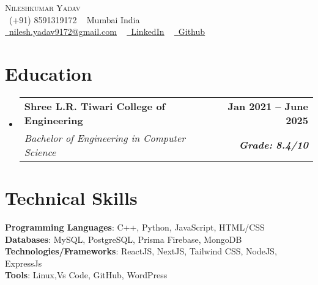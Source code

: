 \documentclass[letterpaper,11pt]{article}
\makeatletter
\newcommand{\resumeSubheading}[4]{
  \vspace{-2pt}\item
    \begin{tabular*}{1.0\textwidth}[t]{l@{\extracolsep{\fill}}r}
      \textbf{#1} & \textbf{\small #2} \\
      \textit{\small#3} & \textit{\small #4} \\
    \end{tabular*}\vspace{-7pt}
}
\newcommand{\resumeSubHeadingListStart}{\begin{itemize}[leftmargin=0.0in, label={}]}
\newcommand{\resumeSubHeadingListEnd}{\end{itemize}}
\makeatother
\begin{document}

\begin{center}
    {\Huge \scshape Nileshkumar Yadav} \\ \vspace{1pt}
    \raisebox{-0.1\height}\faPhone\ (+91) 8591319172 ~ 
    Mumbai India \\ \vspace{1pt}
    \small \href{nilesh.yadav9172@gmail.com}{\raisebox{-0.2\height}\faEnvelope\  \underline{nilesh.yadav9172@gmail.com}} ~ 
    \href{https://www.linkedin.com/in/nilesh-yadav-9b302322a/}{\raisebox{-0.2\height}\faLinkedin\ \underline{LinkedIn}}  ~
    \href{https://github.com/Ni1esh-Yadav}{\raisebox{-0.2\height}\faGithub\ \underline{Github}}
    \vspace{-8pt}
\end{center}


\section{Education}
  \resumeSubHeadingListStart
    \resumeSubheading
      {Shree L.R. Tiwari College of Engineering}{Jan 2021 -- June 2025}
      {Bachelor of Engineering in Computer Science  }{\textbf{Grade}\textbf{:}\textbf{ 8.4/10}}
  \resumeSubHeadingListEnd

%
\section{Technical Skills}
 \begin{itemize}[leftmargin=0.15in, label={}]
    \small{\item{
     \textbf{Programming Languages}{:  C++, Python, JavaScript, HTML/CSS} \\
\textbf{Databases}{:  MySQL, PostgreSQL, Prisma Firebase, MongoDB } \\
     \textbf{Technologies/Frameworks}{: ReactJS, NextJS, Tailwind CSS, NodeJS, ExpressJs } \\
     \textbf{Tools}{: Linux,Vs Code, GitHub, WordPress} \\
    }}
 \end{itemize}
 \vspace{-16pt}
\end{document}
